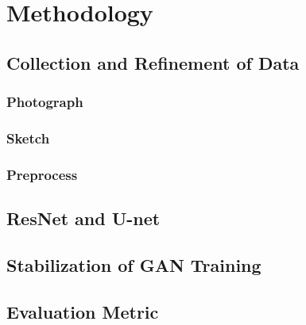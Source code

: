 \chapter{Methodology}\label{Ch:Methodology}


\section{Collection and Refinement of Data}

\subsection{Photograph}

\subsection{Sketch}

\subsection{Preprocess}


\section{ResNet and U-net}


\section{Stabilization of GAN Training}


\section{Evaluation Metric}

\endinput
